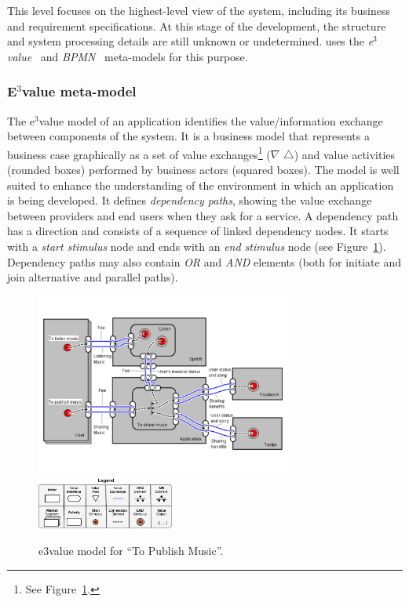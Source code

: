 This level focuses on the highest-level view of the system, including its business and requirement specifications.
At this stage of the development, the structure and system processing details are still unknown or undetermined.  
\pisodm uses the \textit{e$^3$value}~\cite{Gordijn02valuebased} and \textit{BPMN}~\cite{BPMN} meta-models for this purpose. 

\subsubsection{E$^3$value meta-model}

The e$^3$value model of an application identifies the value/information exchange between components of the system. 
It is a business model that represents a business case graphically as a set of value exchanges\footnote{See Figure~\ref{fig:CIM:tpme3v}.} ($\nabla$ $\triangle$) and value activities (rounded boxes) performed by business actors (squared boxes).
The model is well suited to enhance the understanding of the environment in which an application is being developed. 
It defines \textit{dependency paths}, showing the value exchange between providers and end users when they ask for a service.
A dependency path has a direction and consists of a sequence of linked dependency nodes.
It starts with a \textit{start stimulus} node and ends with an \textit{end stimulus} node (see Figure~\ref{fig:CIM:tpme3v}). 
Dependency paths may also contain \textsl{OR} and \textsl{AND} elements (both for initiate and join alternative and parallel paths).

\begin{figure}
\center
\includegraphics[width=0.75\textwidth]{figs/e3value.pdf}
\hspace*{5cm}\includegraphics[width=0.4\textwidth]{figs/3ValueKey.pdf}
\caption{\label{fig:CIM:tpme3v} e3value model for ``To Publish Music''.}
\end{figure}

